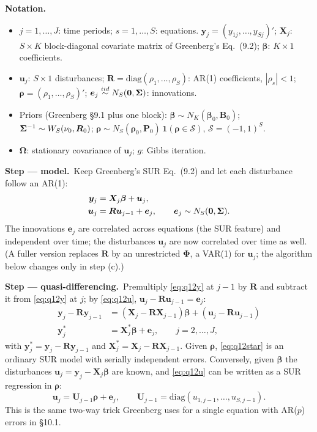 \documentclass[11pt,a4paper]{article}
\newenvironment{notacao}{\par\smallskip\noindent\textbf{Notation.}\begin{itemize}[leftmargin=1.4em,topsep=1pt,itemsep=0pt]\small}{\end{itemize}}
\newcommand{\passo}[2]{\par\smallskip\noindent\textbf{Step --- #1.}~#2}
\begin{document}
\begin{sol}
\begin{notacao}
\item $j=1,\dots,J$: time periods; $s=1,\dots,S$: equations. $\bm y_j=(y_{1j},\dots,y_{Sj})'$; $\bm X_j$:
$S\times K$ block-diagonal covariate matrix of Greenberg's Eq.~(9.2); $\bm\beta$: $K\times1$ coefficients.
\item $\bm u_j$: $S\times1$ disturbances; $\bm R=\mathrm{diag}(\rho_1,\dots,\rho_S)$: AR(1) coefficients,
$|\rho_s|<1$; $\bm\rho=(\rho_1,\dots,\rho_S)'$; $\bm e_j\overset{iid}{\sim}N_S(\bm0,\bm{\Sigma})$: innovations.
\item Priors (Greenberg \S9.1 plus one block): $\bm\beta\sim N_K(\bm\beta_0,\bm B_0)$;
$\bm{\Sigma}^{-1}\sim W_S(\nu_0,\bm R_0)$; $\bm\rho\sim N_S(\bm\rho_0,\bm P_0)\,\mathbf 1(\bm\rho\in\mathcal S)$,
$\mathcal S=(-1,1)^S$.
\item $\bm\Omega$: stationary covariance of $\bm u_j$; $g$: Gibbs iteration.
\end{notacao}

\passo{model}{Keep Greenberg's SUR Eq.~(9.2) and let each disturbance follow an AR(1):
\begin{align}
\bm y_j&=\bm X_j\bm\beta+\bm u_j,\label{eq:q12y}\\
\bm u_j&=\bm R\bm u_{j-1}+\bm e_j,\qquad \bm e_j\sim N_S(\bm0,\bm{\Sigma}).\label{eq:q12u}
\end{align}
The innovations $\bm e_j$ are correlated across equations (the SUR feature) and independent over time;
the disturbances $\bm u_j$ are now correlated over time as well. (A fuller version replaces $\bm R$ by an
unrestricted $\bm\Phi$, a VAR(1) for $\bm u_j$; the algorithm below changes only in step (c).)}

\passo{quasi-differencing}{Premultiply \eqref{eq:q12y} at $j-1$ by $\bm R$ and subtract it from
\eqref{eq:q12y} at $j$; by \eqref{eq:q12u}, $\bm u_j-\bm R\bm u_{j-1}=\bm e_j$:
\begin{align}
\bm y_j-\bm R\bm y_{j-1}&=(\bm X_j-\bm R\bm X_{j-1})\bm\beta+(\bm u_j-\bm R\bm u_{j-1})\nonumber\\
\bm y_j^*&=\bm X_j^*\bm\beta+\bm e_j,\qquad j=2,\dots,J,\label{eq:q12star}
\end{align}
with $\bm y_j^*=\bm y_j-\bm R\bm y_{j-1}$ and $\bm X_j^*=\bm X_j-\bm R\bm X_{j-1}$. Given $\bm\rho$,
\eqref{eq:q12star} is an ordinary SUR model with serially independent errors. Conversely, given $\bm\beta$
the disturbances $\bm u_j=\bm y_j-\bm X_j\bm\beta$ are known, and \eqref{eq:q12u} can be written as a SUR
regression in $\bm\rho$:
\begin{equation}
\bm u_j=\bm U_{j-1}\bm\rho+\bm e_j,\qquad \bm U_{j-1}=\mathrm{diag}(u_{1,j-1},\dots,u_{S,j-1}).\label{eq:q12rho}
\end{equation}
This is the same two-way trick Greenberg uses for a single equation with AR($p$) errors in \S10.1.}


\end{sol}
\end{document}
